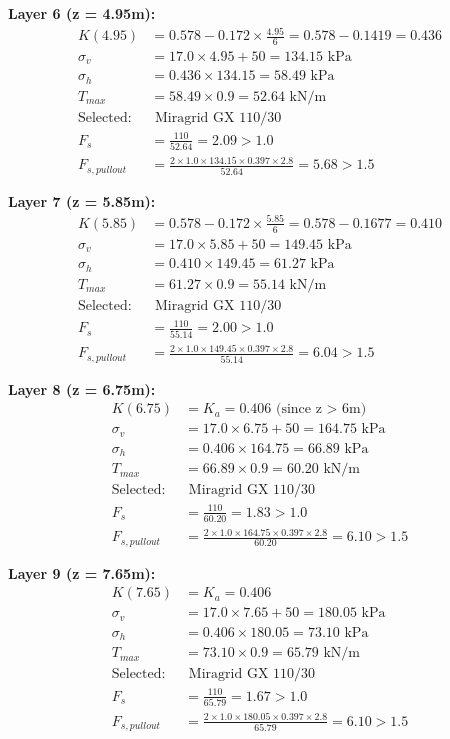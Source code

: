 \documentclass[10pt,a4paper,twocolumn]{article}
\begin{document}
\textbf{Layer 6 (z = 4.95m):}
\begin{align}
K(4.95) &= 0.578 - 0.172 \times \frac{4.95}{6} = 0.578 - 0.1419 = 0.436 \\
\sigma_v &= 17.0 \times 4.95 + 50 = 134.15 \text{ kPa} \\
\sigma_h &= 0.436 \times 134.15 = 58.49 \text{ kPa} \\
T_{max} &= 58.49 \times 0.9 = 52.64 \text{ kN/m} \\
\text{Selected:} &\text{ Miragrid GX 110/30} \\
F_s &= \frac{110}{52.64} = 2.09 > 1.0\\
F_{s,pullout} &= \frac{2 \times 1.0 \times 134.15 \times 0.397 \times 2.8}{52.64} = 5.68 > 1.5
\end{align}

\textbf{Layer 7 (z = 5.85m):}
\begin{align}
K(5.85) &= 0.578 - 0.172 \times \frac{5.85}{6} = 0.578 - 0.1677 = 0.410 \\
\sigma_v &= 17.0 \times 5.85 + 50 = 149.45 \text{ kPa} \\
\sigma_h &= 0.410 \times 149.45 = 61.27 \text{ kPa} \\
T_{max} &= 61.27 \times 0.9 = 55.14 \text{ kN/m} \\
\text{Selected:} &\text{ Miragrid GX 110/30} \\
F_s &= \frac{110}{55.14} = 2.00 > 1.0 \\
F_{s,pullout} &= \frac{2 \times 1.0 \times 149.45 \times 0.397 \times 2.8}{55.14} = 6.04 > 1.5
\end{align}

\textbf{Layer 8 (z = 6.75m):}
\begin{align}
K(6.75) &= K_a = 0.406 \text{ (since z > 6m)} \\
\sigma_v &= 17.0 \times 6.75 + 50 = 164.75 \text{ kPa} \\
\sigma_h &= 0.406 \times 164.75 = 66.89 \text{ kPa} \\
T_{max} &= 66.89 \times 0.9 = 60.20 \text{ kN/m} \\
\text{Selected:} &\text{ Miragrid GX 110/30} \\
F_s &= \frac{110}{60.20} = 1.83 > 1.0 \\
F_{s,pullout} &= \frac{2 \times 1.0 \times 164.75 \times 0.397 \times 2.8}{60.20} = 6.10 > 1.5
\end{align}

\textbf{Layer 9 (z = 7.65m):}
\begin{align}
K(7.65) &= K_a = 0.406 \\
\sigma_v &= 17.0 \times 7.65 + 50 = 180.05 \text{ kPa} \\
\sigma_h &= 0.406 \times 180.05 = 73.10 \text{ kPa} \\
T_{max} &= 73.10 \times 0.9 = 65.79 \text{ kN/m} \\
\text{Selected:} &\text{ Miragrid GX 110/30} \\
F_s &= \frac{110}{65.79} = 1.67 > 1.0 \\
F_{s,pullout} &= \frac{2 \times 1.0 \times 180.05 \times 0.397 \times 2.8}{65.79} = 6.10 > 1.5
\end{align}
\end{document}
